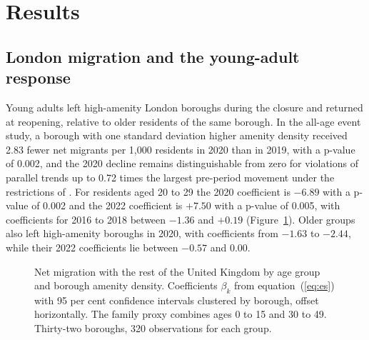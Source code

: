 \documentclass[11pt,a4paper]{article}
\begin{document}
\section{Results}\label{sec:results}

\subsection{London migration and the young-adult response}\label{sec:london}

Young adults left high-amenity London boroughs during the closure and returned at reopening, relative to older residents of the same borough. In the all-age event study, a borough with one standard deviation higher amenity density received 2.83 fewer net migrants per 1,000 residents in 2020 than in 2019, with a p-value of 0.002, and the 2020 decline remains distinguishable from zero for violations of parallel trends up to 0.72 times the largest pre-period movement under the restrictions of \citet{rambachan2023}. For residents aged 20 to 29 the 2020 coefficient is $-6.89$ with a p-value of 0.002 and the 2022 coefficient is $+7.50$ with a p-value of 0.005, with coefficients for 2016 to 2018 between $-1.36$ and $+0.19$ (Figure~\ref{fig:age}). Older groups also left high-amenity boroughs in 2020, with coefficients from $-1.63$ to $-2.44$, while their 2022 coefficients lie between $-0.57$ and 0.00.

\begin{figure}[htbp]
\centering
{}
\caption{Net migration with the rest of the United Kingdom by age group and borough amenity density. Coefficients $\beta_k$ from equation~(\ref{eq:es}) with 95 per cent confidence intervals clustered by borough, offset horizontally. The family proxy combines ages 0 to 15 and 30 to 49. Thirty-two boroughs, 320 observations for each group.}\label{fig:age}
\end{figure}
\end{document}
